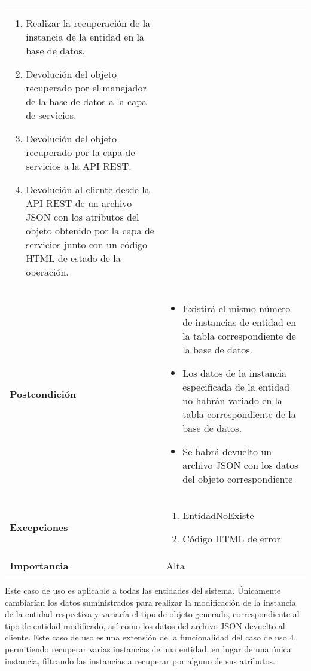 \begin{longtable}{ p{} p{} }
\begin{enumerate}
        \item Realizar la recuperación de la instancia de la entidad en la base de datos.
        \item Devolución del objeto recuperado por el manejador de la base de datos a la capa de servicios.
        \item Devolución del objeto recuperado por la capa de servicios a la API REST.
        \item Devolución  al cliente  desde la API REST de un archivo JSON con los atributos del objeto obtenido por la capa de servicios junto con un código HTML de estado de la operación. 
    \end{enumerate}\\
    \textbf{Postcondición}        & 
    \begin{itemize}
            \item Existirá el mismo número de instancias de entidad en la tabla correspondiente de la base de datos. 
            \item Los datos de la instancia especificada de la entidad no habrán variado en la tabla correspondiente de la base de datos.
            \item Se habrá devuelto un archivo JSON con los datos del objeto correspondiente
    \end{itemize}\\
    \textbf{Excepciones}          & 
        \begin{enumerate}
        \item EntidadNoExiste
            \item Código HTML de error
        \end{enumerate} \\
    \textbf{Importancia}          & Alta \\
    \hline
\end{longtable}

\newpage
Este caso de uso es aplicable a todas las entidades del sistema. Únicamente cambiarían los datos suministrados para realizar la modificación de la instancia de la entidad respectiva y variaría el tipo de objeto generado, correspondiente al tipo de entidad modificado, así como los datos del archivo JSON devuelto al cliente. Este caso de uso es una extensión de la funcionalidad del caso de uso 4, permitiendo recuperar varias instancias de una entidad, en lugar de una única instancia, filtrando las instancias a recuperar por alguno de sus atributos.


